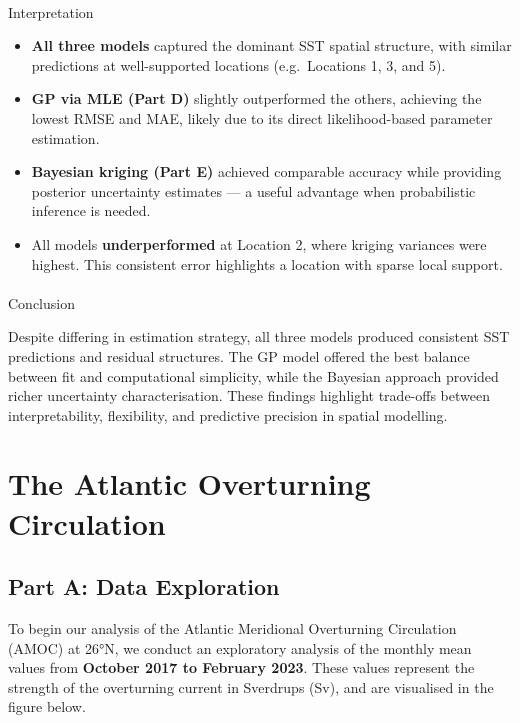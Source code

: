 \documentclass[
  11pt,
]{article}
\makeatletter
\let\oldparagraph\paragraph
\renewcommand{\paragraph}{
    \@ifstar
      \xxxParagraphStar
      \xxxParagraphNoStar
  }
\newcommand{\xxxParagraphStar}[1]{\oldparagraph*{#1}\mbox{}}
\newcommand{\xxxParagraphNoStar}[1]{\oldparagraph{#1}\mbox{}}
\makeatother
\begin{document}
\paragraph{Interpretation}\label{interpretation-1}

\begin{itemize}
\item
  \textbf{All three models} captured the dominant SST spatial structure,
  with similar predictions at well-supported locations (e.g.~Locations
  1, 3, and 5).
\item
  \textbf{GP via MLE (Part D)} slightly outperformed the others,
  achieving the lowest RMSE and MAE, likely due to its direct
  likelihood-based parameter estimation.
\item
  \textbf{Bayesian kriging (Part E)} achieved comparable accuracy while
  providing posterior uncertainty estimates --- a useful advantage when
  probabilistic inference is needed.
\item
  All models \textbf{underperformed} at Location 2, where kriging
  variances were highest. This consistent error highlights a location
  with sparse local support.
\end{itemize}

\paragraph{Conclusion}\label{conclusion}

Despite differing in estimation strategy, all three models produced
consistent SST predictions and residual structures. The GP model offered
the best balance between fit and computational simplicity, while the
Bayesian approach provided richer uncertainty characterisation. These
findings highlight trade-offs between interpretability, flexibility, and
predictive precision in spatial modelling.

\newpage

\section{The Atlantic Overturning
Circulation}\label{the-atlantic-overturning-circulation}

\subsection{Part A: Data Exploration}\label{part-a-data-exploration}

To begin our analysis of the Atlantic Meridional Overturning Circulation
(AMOC) at 26°N, we conduct an exploratory analysis of the monthly mean
values from \textbf{October 2017 to February 2023}. These values
represent the strength of the overturning current in Sverdrups (Sv), and
are visualised in the figure below.
\end{document}
